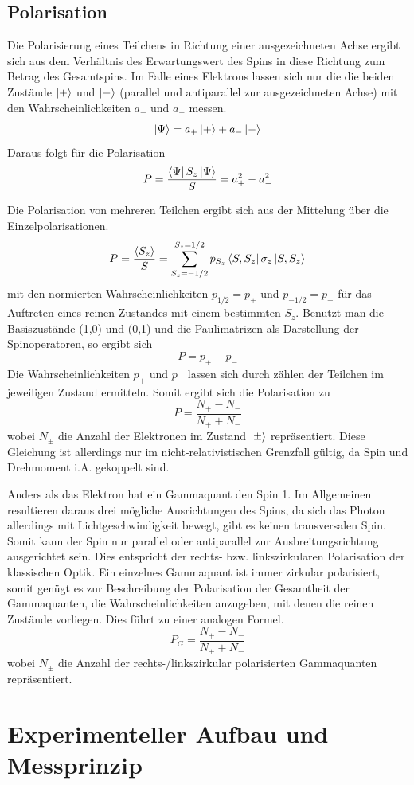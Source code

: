 \subsection{Polarisation}
Die Polarisierung eines Teilchens in Richtung einer ausgezeichneten Achse ergibt sich aus dem Verhältnis des Erwartungswert des Spins in diese Richtung zum Betrag des Gesamtspins. Im Falle eines Elektrons lassen sich nur die die beiden Zustände $\ket{+}$ und $\ket{-}$ (parallel und antiparallel zur ausgezeichneten Achse) mit den Wahrscheinlichkeiten $a_+$ und $a_-$ messen. 
$$\ket{\Psi} = a_+\ket{+} + a_-\ket{-}$$
Daraus folgt für die Polarisation
$$P = \frac{\bra{\Psi} S_z  \ket{\Psi}}{S} = a_+^2 - a_-^2$$

Die Polarisation von mehreren Teilchen ergibt sich aus der Mittelung über die Einzelpolarisationen. 
$$P = \Bar{\frac{{\braket{S_z}}}{S}} = \sum_{S_z = -1/2}^{S_z=1/2} p_{S_z} \bra{S,S_z}\sigma_z\ket{S,S_z}$$
mit den normierten Wahrscheinlichkeiten $p_{1/2} = p_+$ und $p_{-1/2}= p_-$ für das Auftreten eines reinen Zustandes mit einem bestimmten $S_z$. Benutzt man die Basiszustände (1,0) und (0,1) und die Paulimatrizen als Darstellung der Spinoperatoren, so ergibt sich 
$$P = p_+ - p_-$$
Die Wahrscheinlichkeiten $p_+$ und $p_-$ lassen sich durch zählen der Teilchen im jeweiligen Zustand ermitteln. Somit ergibt sich die Polarisation zu
$$P = \frac{N_+ - N_-}{N_+ + N_-}$$
wobei $N_\pm$ die Anzahl der Elektronen im Zustand $\ket{\pm}$ repräsentiert. Diese Gleichung ist allerdings nur im nicht-relativistischen Grenzfall gültig, da Spin und Drehmoment i.A. gekoppelt sind. 

Anders als das Elektron hat ein Gammaquant den Spin 1. Im Allgemeinen resultieren daraus drei mögliche Ausrichtungen des Spins, da sich das Photon allerdings mit Lichtgeschwindigkeit bewegt, gibt es keinen transversalen Spin. Somit kann der Spin nur parallel oder antiparallel zur Ausbreitungsrichtung ausgerichtet sein. Dies entspricht der rechts- bzw. linkszirkularen  Polarisation der klassischen Optik. Ein einzelnes Gammaquant ist immer zirkular polarisiert, somit genügt es zur Beschreibung der Polarisation der Gesamtheit der Gammaquanten, die Wahrscheinlichkeiten anzugeben, mit denen die reinen Zustände vorliegen. Dies führt zu einer analogen Formel.
$$P_G = \frac{N_+ - N_-}{N_+ + N_-}$$
wobei $N_\pm$ die Anzahl der rechts-/linkszirkular polarisierten Gammaquanten repräsentiert. \\


\section{Experimenteller Aufbau und Messprinzip}
